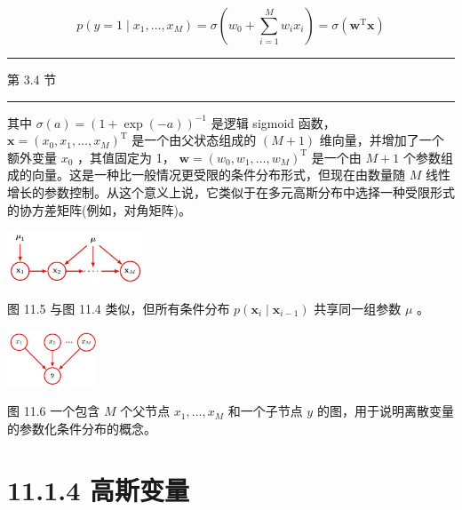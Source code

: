 \documentclass[10pt]{report}
\newcommand{\HRule}{\begin{center}\rule{0.9\linewidth}{0.2mm}\end{center}}
\begin{document}
\[
p\left( {y = 1 \mid  {x}_{1},\ldots ,{x}_{M}}\right)  = \sigma \left( {{w}_{0} + \mathop{\sum }\limits_{{i = 1}}^{M}{w}_{i}{x}_{i}}\right)  = \sigma \left( {{\mathbf{w}}^{\mathrm{T}}\mathbf{x}}\right)  \tag{11.8}
\]

\HRule

第 3.4 节

\HRule

其中 \(\sigma \left( a\right)  = {\left( 1 + \exp \left( -a\right) \right) }^{-1}\) 是逻辑 sigmoid 函数， \(\mathbf{x} = {\left( {x}_{0},{x}_{1},\ldots ,{x}_{M}\right) }^{\mathrm{T}}\) 是一个由父状态组成的 \(\left( {M + 1}\right)\) 维向量，并增加了一个额外变量 \({x}_{0}\) ，其值固定为 1， \(\mathbf{w} = {\left( {w}_{0},{w}_{1},\ldots ,{w}_{M}\right) }^{\mathrm{T}}\) 是一个由 \(M + 1\) 个参数组成的向量。这是一种比一般情况更受限的条件分布形式，但现在由数量随 \(M\) 线性增长的参数控制。从这个意义上说，它类似于在多元高斯分布中选择一种受限形式的协方差矩阵(例如，对角矩阵)。

\begin{center}
\includegraphics[max width=0.3\textwidth]{images/0194e279-9b28-703a-88f4-c3ac21e2010d_350_1073_1825_475_185_0.jpg}
\end{center}
\hspace*{3em} 

图 11.5 与图 11.4 类似，但所有条件分布 \(p\left( {{\mathbf{x}}_{i} \mid  {\mathbf{x}}_{i - 1}}\right)\) 共享同一组参数 \(\mu\) 。

\begin{center}
\includegraphics[max width=0.2\textwidth]{images/0194e279-9b28-703a-88f4-c3ac21e2010d_351_1202_344_349_220_0.jpg}
\end{center}
\hspace*{3em} 

图 11.6 一个包含 \(M\) 个父节点 \({x}_{1},\ldots ,{x}_{M}\) 和一个子节点 \(y\) 的图，用于说明离散变量的参数化条件分布的概念。

\section*{11.1.4 高斯变量}
\end{document}
